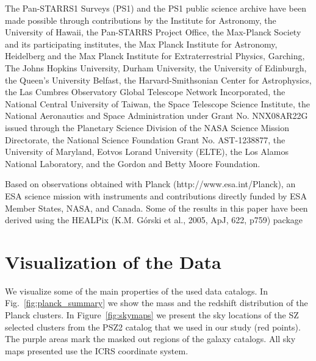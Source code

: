 \documentclass[iop, apjl, twocolappendix, numberedappendix]{emulateapj}
\begin{document}
The Pan-STARRS1 Surveys (PS1) and the PS1 public science archive
have been made possible through contributions by the Institute for
Astronomy, the University of Hawaii, the Pan-STARRS Project Office,
the Max-Planck Society and its participating institutes, the Max
Planck Institute for Astronomy, Heidelberg and the Max Planck
Institute for Extraterrestrial Physics, Garching, The Johns Hopkins
University, Durham University, the University of Edinburgh, the
Queen's University Belfast, the Harvard-Smithsonian Center for
Astrophysics, the Las Cumbres Observatory Global Telescope Network
Incorporated, the National Central University of Taiwan, the Space
Telescope Science Institute, the National Aeronautics and Space
Administration under Grant No. NNX08AR22G issued through the
Planetary Science Division of the NASA Science Mission Directorate,
the National Science Foundation Grant No. AST-1238877, the
University of Maryland, Eotvos Lorand University (ELTE), the Los
Alamos National Laboratory, and the Gordon and Betty Moore
Foundation.

Based on observations obtained with Planck
(http://www.esa.int/Planck), an ESA science mission with instruments
and contributions directly funded by ESA Member States, NASA, and
Canada.  Some of the results in this paper have been derived using
the HEALPix (K.M. Górski et al., 2005, ApJ, 622, p759) package


 

\appendix


\section{Visualization of the Data}
\label{sec:figures}

We visualize some of the main properties of the used data catalogs.
In Fig.~\ref{fig:planck_summary} we show the mass and
the redshift distribution of the Planck clusters.
In Figure~\ref{fig:skymaps} we present the sky locations of the SZ selected clusters from the PSZ2 catalog that we used in our study (red points). The purple areas mark the masked out regions of the galaxy catalogs. All sky maps presented use the ICRS coordinate system.
\end{document}
